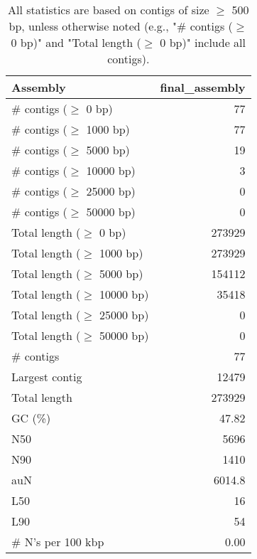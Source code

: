 \documentclass[12pt,a4paper]{article}
\begin{document}
\begin{table}[ht]
\begin{center}
\caption{All statistics are based on contigs of size $\geq$ 500 bp, unless otherwise noted (e.g., "\# contigs ($\geq$ 0 bp)" and "Total length ($\geq$ 0 bp)" include all contigs).}
\begin{tabular}{|l*{1}{|r}|}
\hline
Assembly & final\_assembly \\ \hline
\# contigs ($\geq$ 0 bp) & 77 \\ \hline
\# contigs ($\geq$ 1000 bp) & 77 \\ \hline
\# contigs ($\geq$ 5000 bp) & 19 \\ \hline
\# contigs ($\geq$ 10000 bp) & 3 \\ \hline
\# contigs ($\geq$ 25000 bp) & 0 \\ \hline
\# contigs ($\geq$ 50000 bp) & 0 \\ \hline
Total length ($\geq$ 0 bp) & 273929 \\ \hline
Total length ($\geq$ 1000 bp) & 273929 \\ \hline
Total length ($\geq$ 5000 bp) & 154112 \\ \hline
Total length ($\geq$ 10000 bp) & 35418 \\ \hline
Total length ($\geq$ 25000 bp) & 0 \\ \hline
Total length ($\geq$ 50000 bp) & 0 \\ \hline
\# contigs & 77 \\ \hline
Largest contig & 12479 \\ \hline
Total length & 273929 \\ \hline
GC (\%) & 47.82 \\ \hline
N50 & 5696 \\ \hline
N90 & 1410 \\ \hline
auN & 6014.8 \\ \hline
L50 & 16 \\ \hline
L90 & 54 \\ \hline
\# N's per 100 kbp & 0.00 \\ \hline
\end{tabular}
\end{center}
\end{table}
\end{document}
